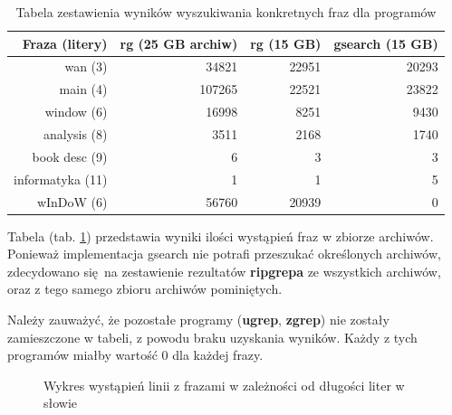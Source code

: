\begin{table}[h]
    \centering
    \begin{tabular}{|r|r|r|r|}
        \hline
        \textbf{Fraza (litery)} & \textbf{rg (25 GB archiw)} & \textbf{rg (15 GB)} &  \textbf{gsearch (15 GB)} \\
        \hline
        wan (3) & 34821 & 22951 & 20293 \\
        \hline
        main (4) & 107265 & 22521 & 23822 \\
        \hline
        window (6) & 16998 & 8251 & 9430 \\
        \hline
        analysis (8) & 3511 & 2168 & 1740 \\
        \hline
        book desc (9) & 6 & 3 & 3 \\
        \hline
        informatyka (11) & 1 & 1 & 5 \\
        \hline
        wInDoW (6) & 56760 & 20939 & 0 \\
        \hline
    \end{tabular}
    \caption{Tabela zestawienia wyników wyszukiwania konkretnych fraz dla programów}
    \label{tabela:iloscWyszukanDziekiProgramom}
\end{table}

Tabela (tab. \ref{tabela:iloscWyszukanDziekiProgramom}) przedstawia wyniki ilości 
wystąpień fraz w zbiorze archiwów. Ponieważ implementacja gsearch nie potrafi
przeszukać określonych archiwów, zdecydowano się na zestawienie rezultatów
\textbf{ripgrepa} ze wszystkich archiwów, oraz z tego samego zbioru archiwów pominiętych. 

Należy zauważyć, że pozostałe programy (\textbf{ugrep}, \textbf{zgrep}) nie 
zostały zamieszczone w tabeli, z powodu braku uzyskania wyników.
Każdy z tych programów miałby wartość 0 dla każdej frazy.

\begin{figure}[h]
    \centering
    \caption{Wykres wystąpień linii z frazami w zależności od długości liter w słowie }
    \label{fig:wykresPorównaniaIlosciWystapień}
\end{figure}

